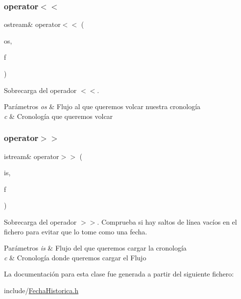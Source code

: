 \subsubsection{\texorpdfstring{operator$<$$<$}{operator<<}}
{\footnotesize\ttfamily ostream\& operator$<$$<$ (\begin{DoxyParamCaption}\item[{ostream \&}]{os,  }\item[{const \hyperlink{classFechaHistorica}{Fecha\+Historica} \&}]{f }\end{DoxyParamCaption})\hspace{0.3cm}{\ttfamily [friend]}}



Sobrecarga del operador $<$$<$. 


\begin{DoxyParams}{Parámetros}
{\em os} & Flujo al que queremos volcar nuestra cronología \\
\hline
{\em c} & Cronología que queremos volcar \\
\hline
\end{DoxyParams}
\mbox{\label{classFechaHistorica_a25a93d162aadd3c52aa1f3d1831e3d75}} 
\subsubsection{\texorpdfstring{operator$>$$>$}{operator>>}}
{\footnotesize\ttfamily istream\& operator$>$$>$ (\begin{DoxyParamCaption}\item[{istream \&}]{is,  }\item[{\hyperlink{classFechaHistorica}{Fecha\+Historica} \&}]{f }\end{DoxyParamCaption})\hspace{0.3cm}{\ttfamily [friend]}}



Sobrecarga del operador $>$$>$. Comprueba si hay saltos de línea vacíos en el fichero para evitar que lo tome como una fecha. 


\begin{DoxyParams}{Parámetros}
{\em is} & Flujo del que queremos cargar la cronología \\
\hline
{\em c} & Cronología donde queremos cargar el Flujo \\
\hline
\end{DoxyParams}


La documentación para esta clase fue generada a partir del siguiente fichero\+:\begin{DoxyCompactItemize}
\item 
include/\hyperlink{FechaHistorica_8h}{Fecha\+Historica.\+h}\end{DoxyCompactItemize}
